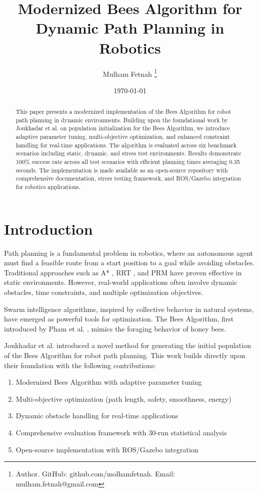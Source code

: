 \documentclass[10pt,a4paper]{article}
\title{\textbf{Modernized Bees Algorithm for Dynamic Path Planning in Robotics}}
\author{
Mulham Fetnah%
\thanks{Author. GitHub: github.com/molhamfetnah. Email: mulham.fetnah@gmail.com}%
}
\date{\today}
\begin{document}
\maketitle

\begin{abstract}
This paper presents a modernized implementation of the Bees Algorithm for robot path planning in dynamic environments. Building upon the foundational work by Joukhadar et al. on population initialization for the Bees Algorithm, we introduce adaptive parameter tuning, multi-objective optimization, and enhanced constraint handling for real-time applications. The algorithm is evaluated across six benchmark scenarios including static, dynamic, and stress test environments. Results demonstrate 100\% success rate across all test scenarios with efficient planning times averaging 0.35 seconds. The implementation is made available as an open-source repository with comprehensive documentation, stress testing framework, and ROS/Gazebo integration for robotics applications.
\end{abstract}

\section{Introduction}
Path planning is a fundamental problem in robotics, where an autonomous agent must find a feasible route from a start position to a goal while avoiding obstacles. Traditional approaches such as A* \cite{hart1968}, RRT \cite{lavalle1998}, and PRM \cite{kavraki1996} have proven effective in static environments. However, real-world applications often involve dynamic obstacles, time constraints, and multiple optimization objectives.

Swarm intelligence algorithms, inspired by collective behavior in natural systems, have emerged as powerful tools for optimization. The Bees Algorithm, first introduced by Pham et al. \cite{pham2006}, mimics the foraging behavior of honey bees.

Joukhadar et al. \cite{joukhadar2024} introduced a novel method for generating the initial population of the Bees Algorithm for robot path planning. This work builds directly upon their foundation with the following contributions:

\begin{enumerate}
    \item Modernized Bees Algorithm with adaptive parameter tuning
    \item Multi-objective optimization (path length, safety, smoothness, energy)
    \item Dynamic obstacle handling for real-time applications
    \item Comprehensive evaluation framework with 30-run statistical analysis
    \item Open-source implementation with ROS/Gazebo integration
\end{enumerate}
\end{document}
